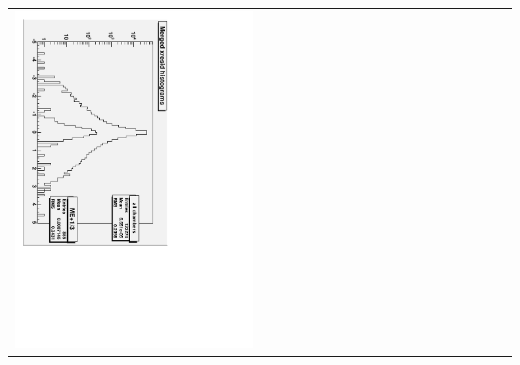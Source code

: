 \documentclass[compress]{beamer}
\begin{document}
\begin{frame}
\begin{center}
\begin{tabular}{p{0.5\linewidth} p{0.5\linewidth}}
\begin{minipage}{\linewidth}
\includegraphics[height=\linewidth, angle=90]{affected_chambers_xresid.pdf}
\end{minipage}
\end{tabular}
\end{center}
\end{frame}
\end{document}

